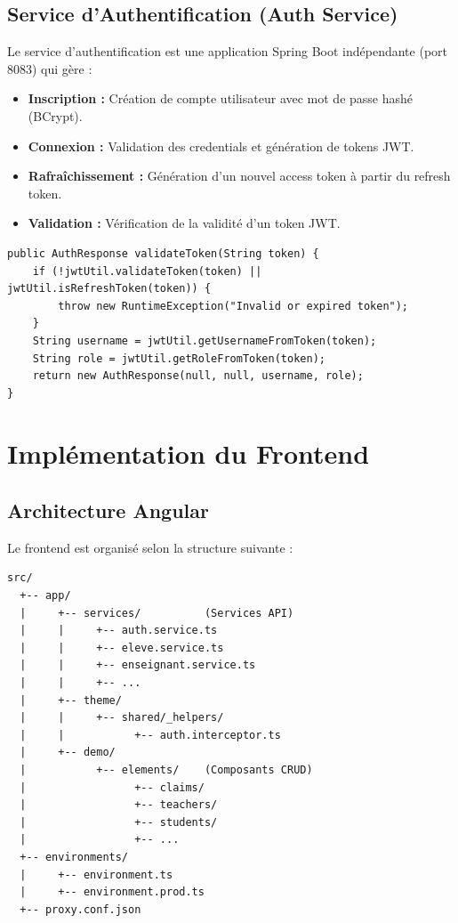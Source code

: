 \documentclass[12pt,a4paper,twoside]{report}
\begin{document}
\section{Service d'Authentification (Auth Service)}

Le service d'authentification est une application Spring Boot indépendante (port 8083) qui gère :
\begin{itemize}[leftmargin=*]
  \item \textbf{Inscription :} Création de compte utilisateur avec mot de passe hashé (BCrypt).
  \item \textbf{Connexion :} Validation des credentials et génération de tokens JWT.
  \item \textbf{Rafraîchissement :} Génération d'un nouvel access token à partir du refresh token.
  \item \textbf{Validation :} Vérification de la validité d'un token JWT.
\end{itemize}

\begin{lstlisting}[style=javaStyle, caption=AuthService - Validation de token]
public AuthResponse validateToken(String token) {
    if (!jwtUtil.validateToken(token) || jwtUtil.isRefreshToken(token)) {
        throw new RuntimeException("Invalid or expired token");
    }
    String username = jwtUtil.getUsernameFromToken(token);
    String role = jwtUtil.getRoleFromToken(token);
    return new AuthResponse(null, null, username, role);
}
\end{lstlisting}

\chapter{Implémentation du Frontend}

\section{Architecture Angular}

Le frontend est organisé selon la structure suivante :

\begin{verbatim}
src/
  +-- app/
  |     +-- services/          (Services API)
  |     |     +-- auth.service.ts
  |     |     +-- eleve.service.ts
  |     |     +-- enseignant.service.ts
  |     |     +-- ...
  |     +-- theme/
  |     |     +-- shared/_helpers/
  |     |           +-- auth.interceptor.ts
  |     +-- demo/
  |           +-- elements/    (Composants CRUD)
  |                 +-- claims/
  |                 +-- teachers/
  |                 +-- students/
  |                 +-- ...
  +-- environments/
  |     +-- environment.ts
  |     +-- environment.prod.ts
  +-- proxy.conf.json
\end{verbatim}
\end{document}
